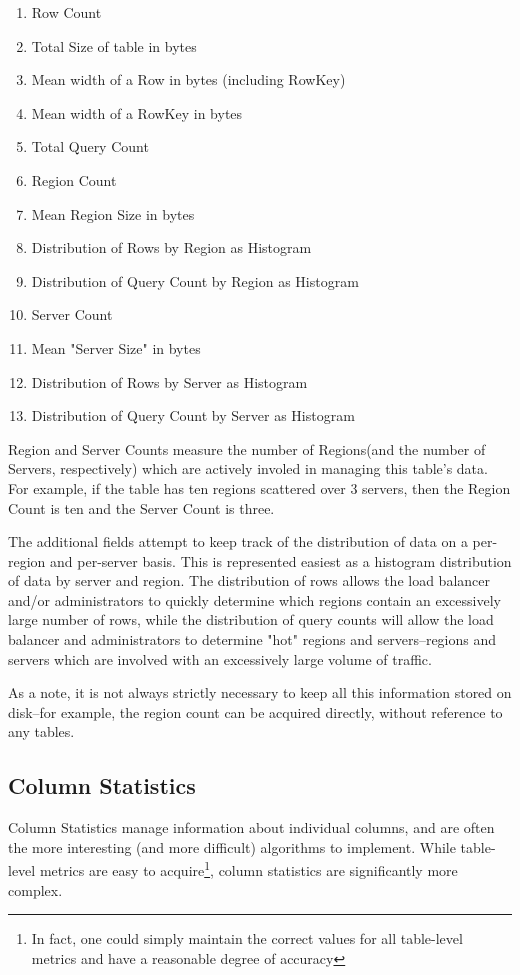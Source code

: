 \begin{enumerate}
				\item Row Count
				\item Total Size of table in bytes
				\item Mean width of a Row in bytes (including RowKey)
				\item Mean width of a RowKey in bytes
				\item Total Query Count
				\item Region Count
				\item Mean Region Size in bytes
				\item Distribution of Rows by Region as Histogram
				\item Distribution of Query Count by Region as Histogram
				\item Server Count
				\item Mean "Server Size" in bytes
				\item Distribution of Rows by Server as Histogram
				\item Distribution of Query Count by Server as Histogram
\end{enumerate}

Region and Server Counts measure the number of Regions(and the number of Servers, respectively) which are actively involed in managing this table's data. For example, if the table has ten regions scattered over 3 servers, then the Region Count is ten and the Server Count is three.

The additional fields attempt to keep track of the distribution of data on a per-region and per-server basis. This is represented easiest as a histogram distribution of data by server and region. The distribution of rows allows the load balancer and/or administrators to quickly determine which regions contain an excessively large number of rows, while the distribution of query counts will allow the load balancer and administrators to determine "hot" regions and servers--regions and servers which are involved with an excessively large volume of traffic.

As a note, it is not always strictly necessary to keep all this information stored on disk--for example, the region count can be acquired directly, without reference to any tables.

\subsection{Column Statistics}
Column Statistics manage information about individual columns, and are often the more interesting (and more difficult) algorithms to implement. While table-level metrics are easy to acquire\footnote{In fact, one could simply maintain the correct values for all table-level metrics and have a reasonable degree of accuracy}, column statistics are significantly more complex.

